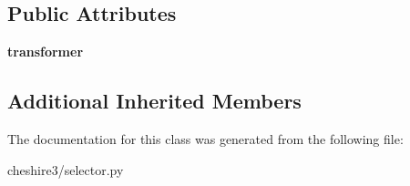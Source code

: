\subsection*{Public Attributes}
\begin{DoxyCompactItemize}
\item 
\hypertarget{classcheshire3_1_1selector_1_1_transformer_selector_a42e3b5f7ccf61383923354a1bb40c08a}{{\bfseries transformer}}\label{classcheshire3_1_1selector_1_1_transformer_selector_a42e3b5f7ccf61383923354a1bb40c08a}

\end{DoxyCompactItemize}
\subsection*{Additional Inherited Members}


The documentation for this class was generated from the following file\-:\begin{DoxyCompactItemize}
\item 
cheshire3/selector.\-py\end{DoxyCompactItemize}
